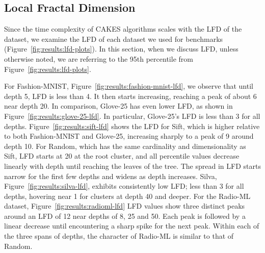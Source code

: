 \subsection{Local Fractal Dimension}
\label{sec:dayasets:lfd-of-datasets}

Since the time complexity of CAKES algorithms scales with the LFD of the dataset, we examine the LFD of each dataset we used for benchmarks (Figure~\ref{fig:results:lfd-plots}).
In this section, when we discuss LFD, unless otherwise noted, we are referring to the 95th percentile from Figure~\ref{fig:results:lfd-plots}.

For Fashion-MNIST, Figure~\ref{fig:results:fashion-mnist-lfd}, we observe that until depth 5, LFD is less than 4.
It then starts increasing, reaching a peak of about 6 near depth 20.
In comparison, Glove-25 has even lower LFD, as shown in Figure~\ref{fig:results:glove-25-lfd}.
In particular, Glove-25's LFD is less than 3 for all depths.
Figure~\ref{fig:results:sift-lfd} shows the LFD for Sift, which is higher relative to both Fashion-MNIST and Glove-25, increasing sharply to a peak of 9 around depth 10.
For Random, which has the same cardinality and dimensionality as Sift, LFD starts at 20 at the root cluster, and all percentile values decrease linearly with depth until reaching the leaves of the tree.
The spread in LFD starts narrow for the first few depths and widens as depth increases.
Silva, Figure~\ref{fig:results:silva-lfd}, exhibits consistently low LFD;
less than 3 for all depths, hovering near 1 for clusters at depth 40 and deeper.
For the Radio-ML dataset, Figure~\ref{fig:results:radioml-lfd} LFD values show three distinct peaks around an LFD of 12 near depths of 8, 25 and 50.
Each peak is followed by a linear decrease until encountering a sharp spike for the next peak.
Within each of the three spans of depths, the character of Radio-ML is similar to that of Random.


